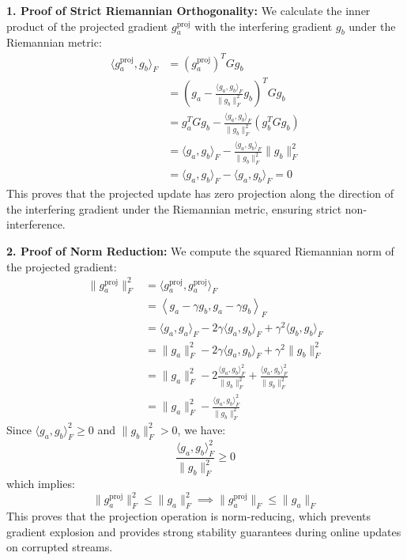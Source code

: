 \documentclass{article}
\theoremstyle{plain}
\theoremstyle{definition}
\theoremstyle{remark}
\begin{document}
\textbf{1. Proof of Strict Riemannian Orthogonality:}
We calculate the inner product of the projected gradient $g_a^{\text{proj}}$ with the interfering gradient $g_b$ under the Riemannian metric:
\begin{align*}
\langle g_a^{\text{proj}}, g_b \rangle_F &= (g_a^{\text{proj}})^T G g_b \\
&= \left( g_a - \frac{\langle g_a, g_b \rangle_F}{\|g_b\|_F^2} g_b \right)^T G g_b \\
&= g_a^T G g_b - \frac{\langle g_a, g_b \rangle_F}{\|g_b\|_F^2} (g_b^T G g_b) \\
&= \langle g_a, g_b \rangle_F - \frac{\langle g_a, g_b \rangle_F}{\|g_b\|_F^2} \|g_b\|_F^2 \\
&= \langle g_a, g_b \rangle_F - \langle g_a, g_b \rangle_F = 0
\end{align*}
This proves that the projected update has zero projection along the direction of the interfering gradient under the Riemannian metric, ensuring strict non-interference.

\textbf{2. Proof of Norm Reduction:}
We compute the squared Riemannian norm of the projected gradient:
\begin{align*}
\|g_a^{\text{proj}}\|_F^2 &= \langle g_a^{\text{proj}}, g_a^{\text{proj}} \rangle_F \\
&= \left\langle g_a - \gamma g_b, g_a - \gamma g_b \right\rangle_F \\
&= \langle g_a, g_a \rangle_F - 2\gamma \langle g_a, g_b \rangle_F + \gamma^2 \langle g_b, g_b \rangle_F \\
&= \|g_a\|_F^2 - 2 \gamma \langle g_a, g_b \rangle_F + \gamma^2 \|g_b\|_F^2 \\
&= \|g_a\|_F^2 - 2 \frac{\langle g_a, g_b \rangle_F^2}{\|g_b\|_F^2} + \frac{\langle g_a, g_b \rangle_F^2}{\|g_b\|_F^2} \\
&= \|g_a\|_F^2 - \frac{\langle g_a, g_b \rangle_F^2}{\|g_b\|_F^2}
\end{align*}
Since $\langle g_a, g_b \rangle_F^2 \geq 0$ and $\|g_b\|_F^2 > 0$, we have:
\[
\frac{\langle g_a, g_b \rangle_F^2}{\|g_b\|_F^2} \geq 0
\]
which implies:
\[
\|g_a^{\text{proj}}\|_F^2 \leq \|g_a\|_F^2 \implies \|g_a^{\text{proj}}\|_F \leq \|g_a\|_F
\]
This proves that the projection operation is norm-reducing, which prevents gradient explosion and provides strong stability guarantees during online updates on corrupted streams.
\end{document}
